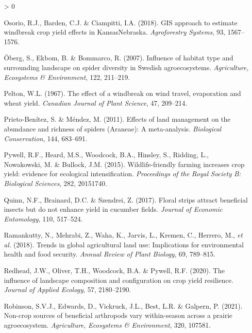 \documentclass[]{elsarticle} %
\newlength{\cslhangindent}
\newenvironment{CSLReferences}[2] %
 {%
  \setlength{\parindent}{0pt}
  \ifodd #1 \everypar{\setlength{\hangindent}{\cslhangindent}}\ignorespaces\fi
  \ifnum #2 > 0
  \setlength{\parskip}{#2\baselineskip}
  \fi
 }%
 {}
\begin{document}
\begin{CSLReferences}{1}{0}
\leavevmode\hypertarget{ref-osorio2018}{}%
Osorio, R.J., Barden, C.J. \& Ciampitti, I.A. (2018). {GIS} approach to estimate windbreak crop yield effects in {Kansas}{{}}{Nebraska}. \emph{Agroforestry Systems}, 93, 1567--1576.

\leavevmode\hypertarget{ref-oberg2007}{}%
Öberg, S., Ekbom, B. \& Bommarco, R. (2007). Influence of habitat type and surrounding landscape on spider diversity in {Swedish} agroecosystems. \emph{Agriculture, Ecosystems {\&} Environment}, 122, 211--219.

\leavevmode\hypertarget{ref-pelton1967}{}%
Pelton, W.L. (1967). The effect of a windbreak on wind travel, evaporation and wheat yield. \emph{Canadian Journal of Plant Science}, 47, 209--214.

\leavevmode\hypertarget{ref-prietoBenitez2011}{}%
Prieto-Benítez, S. \& Méndez, M. (2011). Effects of land management on the abundance and richness of spiders ({Araneae}): A meta-analysis. \emph{Biological Conservation}, 144, 683--691.

\leavevmode\hypertarget{ref-pywell2015}{}%
Pywell, R.F., Heard, M.S., Woodcock, B.A., Hinsley, S., Ridding, L., Nowakowski, M. \& Bullock, J.M. (2015). Wildlife-friendly farming increases crop yield: evidence for ecological intensification. \emph{Proceedings of the Royal Society B: Biological Sciences}, 282, 20151740.

\leavevmode\hypertarget{ref-quinn2017}{}%
Quinn, N.F., Brainard, D.C. \& Szendrei, Z. (2017). Floral strips attract beneficial insects but do not enhance yield in cucumber fields. \emph{Journal of Economic Entomology}, 110, 517--524.

\leavevmode\hypertarget{ref-ramankutty2018}{}%
Ramankutty, N., Mehrabi, Z., Waha, K., Jarvis, L., Kremen, C., Herrero, M., \emph{et al.} (2018). Trends in global agricultural land use: Implications for environmental health and food security. \emph{Annual Review of Plant Biology}, 69, 789--815.

\leavevmode\hypertarget{ref-redhead2020}{}%
Redhead, J.W., Oliver, T.H., Woodcock, B.A. \& Pywell, R.F. (2020). The influence of landscape composition and configuration on crop yield resilience. \emph{Journal of Applied Ecology}, 57, 2180--2190.

\leavevmode\hypertarget{ref-robinson2021}{}%
Robinson, S.V.J., Edwards, D., Vickruck, J.L., Best, L.R. \& Galpern, P. (2021). Non-crop sources of beneficial arthropods vary within-season across a prairie agroecosystem. \emph{Agriculture, Ecosystems {\&} Environment}, 320, 107581.


\end{CSLReferences}
\end{document}
